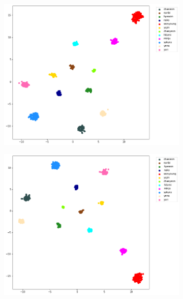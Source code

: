 \begin{enumerate}[left=0pt]
\begin{figure}[htbp]
    \hfill
    \begin{subfigure}{0.24\textwidth}
        \centering
        \includegraphics[trim=26 20 100 0, clip, width=\textwidth]{images/faceReco/inceptionv3-and-binary/tsne-3.png}     
    \end{subfigure}
    \hfill
    \begin{subfigure}{0.24\textwidth}
        \centering
        \includegraphics[trim=26 20 100 0, clip, width=\textwidth]{images/faceReco/inceptionv3-and-binary/tsne-4.png}     
    \end{subfigure}



\end{figure}
\end{enumerate}
